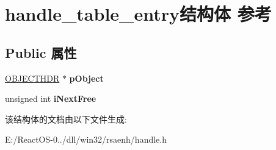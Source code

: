 \hypertarget{structhandle__table__entry}{}\section{handle\+\_\+table\+\_\+entry结构体 参考}
\label{structhandle__table__entry}
\subsection*{Public 属性}
\begin{DoxyCompactItemize}
\item 
\mbox{\label{structhandle__table__entry_a939e9345204159e885908cdca07c0996}} 
\hyperlink{structtag_o_b_j_e_c_t_h_d_r}{O\+B\+J\+E\+C\+T\+H\+DR} $\ast$ {\bfseries p\+Object}
\item 
\mbox{\label{structhandle__table__entry_ae8795265a525ad27d569f6edd5224f4f}} 
unsigned int {\bfseries i\+Next\+Free}
\end{DoxyCompactItemize}


该结构体的文档由以下文件生成\+:\begin{DoxyCompactItemize}
\item 
E\+:/\+React\+O\+S-\/0../dll/win32/rsaenh/handle.\+h\end{DoxyCompactItemize}
